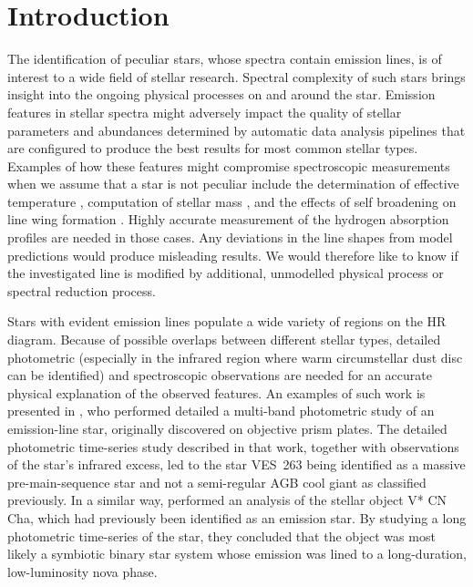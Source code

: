 \section{Introduction}
\label{sec:intro_emis}
The identification of peculiar stars, whose spectra contain emission lines, is of interest to a wide field of stellar research. Spectral complexity of such stars brings insight into the ongoing physical processes on and around the star. Emission features in stellar spectra might adversely impact the quality of stellar parameters and abundances determined by automatic data analysis pipelines that are configured to produce the best results for most common stellar types. Examples of how these features might compromise spectroscopic measurements when we assume that a star is not peculiar include the determination of effective temperature \cite{2011A&A...531A..83C, 2018A&A...615A.139A, 2019A&A...624A..10G}, computation of stellar mass \cite{2016ApJ...823..114N, 2016A&A...594A.120B}, and the effects of self broadening on line wing formation \cite{2000A&A...363.1091B, 2008A&A...480..581A}. Highly accurate measurement of the hydrogen absorption profiles are needed in those cases. Any deviations in the line shapes from model predictions would produce misleading results. We would therefore like to know if the investigated line is modified by additional, unmodelled physical process or spectral reduction process.

Stars with evident emission lines populate a wide variety of regions on the HR diagram. Because of possible overlaps between different stellar types, detailed photometric (especially in the infrared region where warm circumstellar dust disc can be identified) and spectroscopic observations are needed for an accurate physical explanation of the observed features. An examples of such work is presented in \citet{2019MNRAS.488.5536M}, who performed detailed a multi-band photometric study of an emission-line star, originally discovered on objective prism plates. The detailed photometric time-series study described in that work, together with observations of the star's infrared excess, led to the star VES~263 being identified as a massive pre-main-sequence star and not a semi-regular AGB cool giant as classified previously. In a similar way, \citet{2020arXiv200207852L} performed an analysis of the stellar object V* CN Cha, which had previously been identified as an emission star. By studying a long photometric time-series of the star, they concluded that the object was most likely a symbiotic binary star system whose emission was lined to a long-duration, low-luminosity nova phase.


